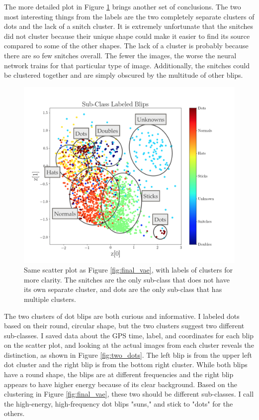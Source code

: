 \documentclass[a4paper]{article}
\begin{document}
The more detailed plot in Figure \ref{fig:detailed_vae} brings another set of conclusions. The two most interesting things from the labels are the two completely separate clusters of dots and the lack of a snitch cluster. It is extremely unfortunate that the snitches did not cluster because their unique shape could make it easier to find its source compared to some of the other shapes. The lack of a cluster is probably because there are so few snitches overall. The fewer the images, the worse the neural network trains for that particular type of image. Additionally, the snitches could be clustered together and are simply obscured by the multitude of other blips. 

\begin{figure}[h!]
	\centering
	\includegraphics[width=.8\linewidth]{vae_detailed}
	\caption{Same scatter plot as Figure \ref{fig:final_vae}, with labels of clusters for more clarity. The snitches are the only sub-class that does not have its own separate cluster, and dots are the only sub-class that has multiple clusters.}
	\label{fig:detailed_vae}
\end{figure}

The two clusters of dot blips are both curious and informative. I labeled dots based on their round, circular shape, but the two clusters suggest two different sub-classes. I saved data about the GPS time, label, and coordinates for each blip on the scatter plot, and looking at the actual images from each cluster reveals the distinction, as shown in Figure \ref{fig:two_dots}. The left blip is from the upper left dot cluster and the right blip is from the bottom right cluster. While both blips have a round shape, the blips are at different frequencies and the right blip appears to have higher energy because of its clear background. Based on the clustering in Figure \ref{fig:final_vae}, these two should be different sub-classes. I call the high-energy, high-frequency dot blips "suns," and stick to "dots" for the others.
\end{document}
